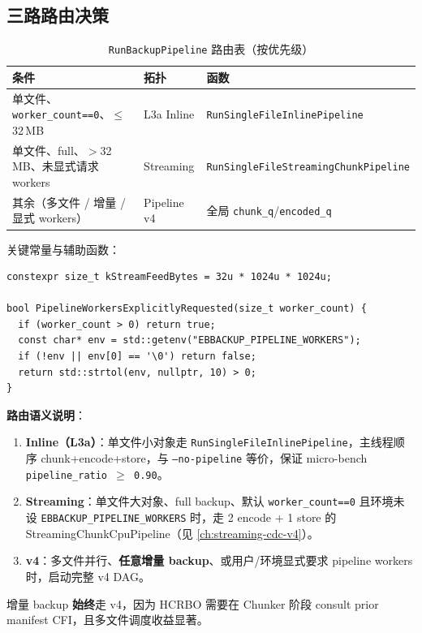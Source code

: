 \subsection{三路路由决策}

\begin{table}[htbp]
\centering
\caption{\texttt{RunBackupPipeline} 路由表（按优先级）}
\small
\begin{tabular}{@{}llp{6.2cm}@{}}
\toprule
条件 & 拓扑 & 函数 \\
\midrule
单文件、\texttt{worker\_count==0}、$\leq$32\,MB & L3a Inline & \texttt{RunSingleFileInlinePipeline} \\
单文件、full、$>$32\,MB、未显式请求 workers & Streaming & \texttt{RunSingleFileStreamingChunkPipeline} \\
其余（多文件 / 增量 / 显式 workers） & Pipeline v4 & 全局 \texttt{chunk\_q}/\texttt{encoded\_q} \\
\bottomrule
\end{tabular}
\end{table}

关键常量与辅助函数：
\begin{lstlisting}[caption={路由阈值与显式 worker 检测},label={lst:pipeline-routing}]
constexpr size_t kStreamFeedBytes = 32u * 1024u * 1024u;

bool PipelineWorkersExplicitlyRequested(size_t worker_count) {
  if (worker_count > 0) return true;
  const char* env = std::getenv("EBBACKUP_PIPELINE_WORKERS");
  if (!env || env[0] == '\0') return false;
  return std::strtol(env, nullptr, 10) > 0;
}
\end{lstlisting}

\textbf{路由语义说明}：
\begin{enumerate}
  \item \textbf{Inline（L3a）}：单文件小对象走 \texttt{RunSingleFileInlinePipeline}，主线程顺序 chunk+encode+store，与 \texttt{--no-pipeline} 等价，保证 micro-bench \texttt{pipeline\_ratio $\geq$ 0.90}。
  \item \textbf{Streaming}：单文件大对象、full backup、默认 \texttt{worker\_count==0} 且环境未设 \texttt{EBBACKUP\_PIPELINE\_WORKERS} 时，走 2 encode + 1 store 的 StreamingChunkCpuPipeline（见 \cref{ch:streaming-cdc-v4}）。
  \item \textbf{v4}：多文件并行、\textbf{任意增量 backup}、或用户/环境显式要求 pipeline workers 时，启动完整 v4 DAG。
\end{enumerate}

增量 backup \textbf{始终}走 v4，因为 HCRBO 需要在 Chunker 阶段 consult prior manifest CFI，且多文件调度收益显著。

